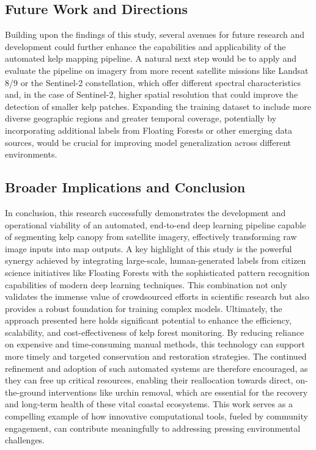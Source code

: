 \documentclass{article}
\begin{document}
\subsection{Future Work and Directions}

Building upon the findings of this study, several avenues for future research and development could further enhance the capabilities and applicability of the automated kelp mapping pipeline. A natural next step would be to apply and evaluate the pipeline on imagery from more recent satellite missions like Landsat 8/9 or the Sentinel-2 constellation, which offer different spectral characteristics and, in the case of Sentinel-2, higher spatial resolution that could improve the detection of smaller kelp patches. Expanding the training dataset to include more diverse geographic regions and greater temporal coverage, potentially by incorporating additional labels from Floating Forests or other emerging data sources, would be crucial for improving model generalization across different environments. 

\subsection{Broader Implications and Conclusion}

In conclusion, this research successfully demonstrates the development and operational viability of an automated, end-to-end deep learning pipeline capable of segmenting kelp canopy from satellite imagery, effectively transforming raw image inputs into map outputs. A key highlight of this study is the powerful synergy achieved by integrating large-scale, human-generated labels from citizen science initiatives like Floating Forests with the sophisticated pattern recognition capabilities of modern deep learning techniques. This combination not only validates the immense value of crowdsourced efforts in scientific research but also provides a robust foundation for training complex models. Ultimately, the approach presented here holds significant potential to enhance the efficiency, scalability, and cost-effectiveness of kelp forest monitoring. By reducing reliance on expensive and time-consuming manual methods, this technology can support more timely and targeted conservation and restoration strategies. The continued refinement and adoption of such automated systems are therefore encouraged, as they can free up critical resources, enabling their reallocation towards direct, on-the-ground interventions like urchin removal, which are essential for the recovery and long-term health of these vital coastal ecosystems. This work serves as a compelling example of how innovative computational tools, fueled by community engagement, can contribute meaningfully to addressing pressing environmental challenges.
\end{document}
